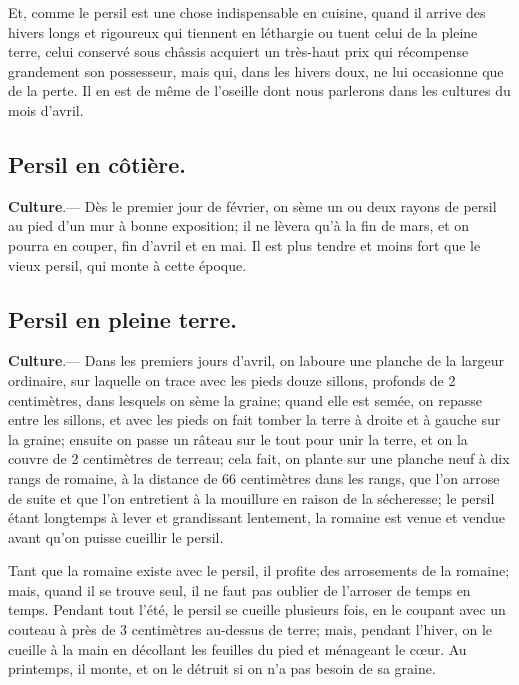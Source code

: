 \documentclass[10pt,a4paper]{book}
\begin{document}
Et, comme le persil est une chose indispensable en cuisine, quand il arrive des hivers longs et rigoureux qui tiennent en léthargie ou tuent celui de la pleine terre, celui conservé sous châssis acquiert un très-haut prix qui récompense grandement son possesseur, mais qui, dans les hivers doux, ne lui occasionne que de la perte. Il en est de même de l'oseille dont nous parlerons dans les cultures du mois d'avril.

\subsection{Persil en côtière.}

\textbf{Culture}.--- Dès le premier jour de février, on sème un ou deux rayons de persil au pied d'un mur à bonne exposition; il ne lèvera qu'à la fin de mars, et on pourra en couper, fin d'avril et en mai. Il est plus tendre et moins fort que le vieux persil, qui monte à cette époque.

\subsection{Persil en pleine terre.}

\textbf{Culture}.--- Dans les premiers jours d'avril, on laboure une planche de la largeur ordinaire, sur laquelle on trace avec les pieds douze sillons, profonds de 2 centimètres, dans lesquels on sème la graine; quand elle est semée, on repasse entre les sillons, et avec les pieds on fait tomber la terre à droite et à gauche sur la graine; ensuite on passe un râteau sur le tout pour unir la terre, et on la couvre de 2 centimètres de terreau; cela fait, on plante sur une planche neuf à dix rangs de romaine, à la distance de 66 centimètres dans les rangs, que l'on arrose de suite et que l'on entretient à la mouillure en raison de la sécheresse; le persil étant longtemps à lever et grandissant lentement, la romaine est venue et vendue avant qu'on puisse cueillir le persil.

Tant que la romaine existe avec le persil, il profite des arrosements de la romaine; mais, quand il se trouve seul, il ne faut pas oublier de l'arroser de temps en temps. Pendant tout l'été, le persil se cueille plusieurs fois, en le coupant avec un couteau à près de 3 centimètres au-dessus de terre; mais, pendant l'hiver, on le cueille à la main en décollant les feuilles du pied et ménageant le cœur. Au printemps, il monte, et on le détruit si on n'a pas besoin de sa graine.
\end{document}
